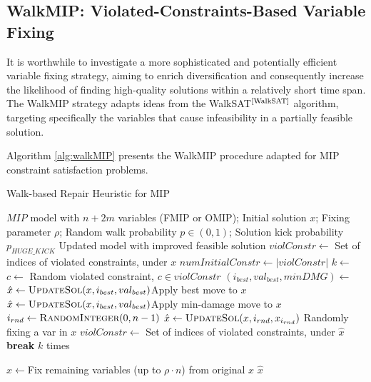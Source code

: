\subsection{WalkMIP: Violated-Constraints-Based Variable Fixing}

It is worthwhile to investigate a more sophisticated and potentially efficient variable fixing strategy, aiming to enrich diversification and consequently increase the likelihood of finding high-quality solutions within a relatively short time span. The WalkMIP strategy adapts ideas from the WalkSAT$^\text{\cite{WalkSAT}}$ algorithm, targeting specifically the variables that cause infeasibility in a partially feasible solution. 

Algorithm \ref{alg:walkMIP} presents the WalkMIP procedure adapted for MIP constraint satisfaction problems.

\begin{algorithm}[H]
\caption{Walk-based Repair Heuristic for MIP}\label{alg:walkMIP}
\begin{algorithmic}[1]
\Require $MIP$ model with $n+2m$ variables (FMIP or OMIP); Initial solution $x$; Fixing parameter $\rho$; Random walk probability $p \in (0,1)$; Solution kick probability $p_{HUGE\_KICK}$
\Ensure Updated model with improved feasible solution
    \State $violConstr \gets$ Set of indices of violated constraints, under $x$
     $numInitialConstr \gets |violConstr|$\EndIf
     \Return \EndIf
        \State {}
    \EndIf
    \State $k \gets $
    \Repeat
        \State $c \gets $ Random violated constraint, $c \in violConstr$
        \State $(i_{best}, val_{best}, minDMG) \gets$ 
            \State $\hat{x} \gets \Call{UpdateSol}{x,i_{best},val_{best}}$\Comment Apply best move to $x$
             \State $\hat{x} \gets \Call{UpdateSol}{x,i_{best},val_{best}}$\Comment Apply min-damage move to $x$
        \Else 
            \State $i_{rnd} \gets \Call{RandomInteger}{0,n-1}$
            \State $\hat{x} \gets \Call{UpdateSol}{x, i_{rnd},x_{i_{rnd}}}$ \Comment Randomly fixing a var in $x$
        \EndIf
        \State $violConstr \gets$ Set of indices of violated constraints, under $\hat{x}$
         \textbf{break} \EndIf
    \Until $k$ times

        \State $\hat{x} \gets$Fix remaining variables (up to $\rho \cdot n$) from original $x$
    \EndIf
    \Return $\hat{x}$
\EndFunction
\end{algorithmic}
\end{algorithm}

